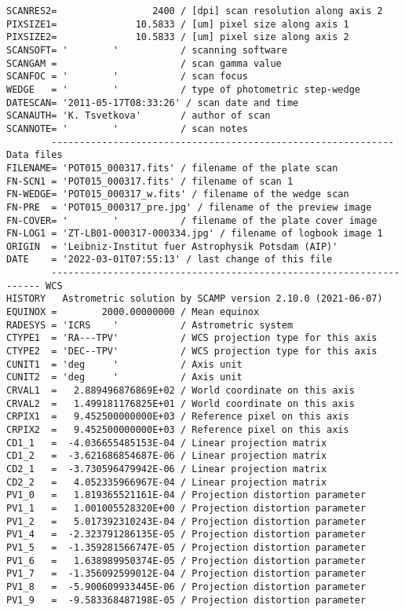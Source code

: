 \documentclass[11pt]{ivoa}
\begin{document}
\begin{lstlisting}
SCANRES2=                 2400 / [dpi] scan resolution along axis 2
PIXSIZE1=              10.5833 / [um] pixel size along axis 1
PIXSIZE2=              10.5833 / [um] pixel size along axis 2
SCANSOFT= '        '           / scanning software
SCANGAM =                      / scan gamma value
SCANFOC = '        '           / scan focus
WEDGE   = '        '           / type of photometric step-wedge
DATESCAN= '2011-05-17T08:33:26' / scan date and time
SCANAUTH= 'K. Tsvetkova'       / author of scan
SCANNOTE= '        '           / scan notes
        ------------------------------------------------------------- Data files
FILENAME= 'POT015_000317.fits' / filename of the plate scan
FN-SCN1 = 'POT015_000317.fits' / filename of scan 1
FN-WEDGE= 'POT015_000317_w.fits' / filename of the wedge scan
FN-PRE  = 'POT015_000317_pre.jpg' / filename of the preview image
FN-COVER= '        '           / filename of the plate cover image
FN-LOG1 = 'ZT-LB01-000317-000334.jpg' / filename of logbook image 1
ORIGIN  = 'Leibniz-Institut fuer Astrophysik Potsdam (AIP)'
DATE    = '2022-03-01T07:55:13' / last change of this file
        -------------------------------------------------------------------- WCS
HISTORY   Astrometric solution by SCAMP version 2.10.0 (2021-06-07)
EQUINOX =        2000.00000000 / Mean equinox
RADESYS = 'ICRS    '           / Astrometric system
CTYPE1  = 'RA---TPV'           / WCS projection type for this axis
CTYPE2  = 'DEC--TPV'           / WCS projection type for this axis
CUNIT1  = 'deg     '           / Axis unit
CUNIT2  = 'deg     '           / Axis unit
CRVAL1  =   2.889496876869E+02 / World coordinate on this axis
CRVAL2  =   1.499181176825E+01 / World coordinate on this axis
CRPIX1  =   9.452500000000E+03 / Reference pixel on this axis
CRPIX2  =   9.452500000000E+03 / Reference pixel on this axis
CD1_1   =  -4.036655485153E-04 / Linear projection matrix
CD1_2   =  -3.621686854687E-06 / Linear projection matrix
CD2_1   =  -3.730596479942E-06 / Linear projection matrix
CD2_2   =   4.052335966967E-04 / Linear projection matrix
PV1_0   =   1.819365521161E-04 / Projection distortion parameter
PV1_1   =   1.001005528320E+00 / Projection distortion parameter
PV1_2   =   5.017392310243E-04 / Projection distortion parameter
PV1_4   =  -2.323791286135E-05 / Projection distortion parameter
PV1_5   =  -1.359281566747E-05 / Projection distortion parameter
PV1_6   =   1.638989950374E-05 / Projection distortion parameter
PV1_7   =  -1.356092599012E-04 / Projection distortion parameter
PV1_8   =  -5.900609933445E-06 / Projection distortion parameter
PV1_9   =  -9.583368487198E-05 / Projection distortion parameter

\end{lstlisting}
\end{document}
